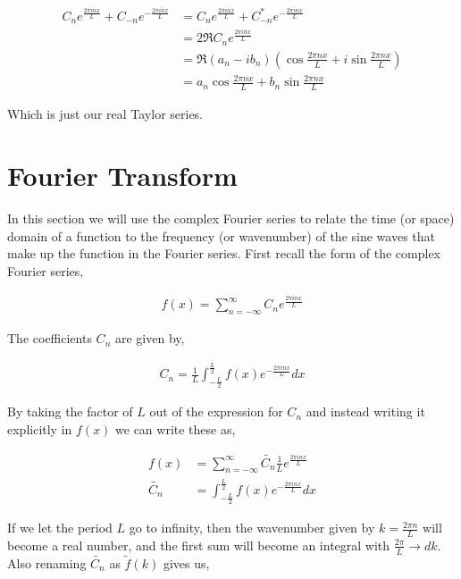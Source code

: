 \documentclass[11pt]{amsart}
\begin{document}
\begin{align*}
  C_n e^{\frac{2\pi inx}{L}} + C_{-n}e^{-\frac{2\pi inx}{L}} &= C_n e^{\frac{2\pi inx}{L}} + C^*_{-n}e^{-\frac{2\pi inx}{L}} \\
                                                             &= 2\Re{C_n e^{\frac{2\pi inx}{L}}} \\
                                                             &= \Re{(a_n - ib_n)\left(\cos{\frac{2\pi nx}{L}} + i\sin{\frac{2\pi nx}{L}}\right)} \\
                                                             &= a_n\cos{\frac{2\pi nx}{L}} + b_n\sin{\frac{2\pi nx}{L}}
\end{align*}

Which is just our real Taylor series.

\section{Fourier Transform}

In this section we will use the complex Fourier series to relate the time (or space) domain of a function to the frequency (or wavenumber) of the sine waves that make up the function in the Fourier series. First recall the form of the complex Fourier series,

\begin{align*}
  f(x) = \sum\limits_{n=-\infty}^{\infty} C_n e^{\frac{2\pi inx}{L}}
\end{align*}

The coefficients $C_n$ are given by,

\begin{align*}
  C_n = \frac{1}{L}\int_{-\frac{L}{2}}^{\frac{L}{2}} f(x) e^{-\frac{2\pi inx}{L}} dx
\end{align*}

By taking the factor of $L$ out of the expression for $C_n$ and instead writing it explicitly in $f(x)$ we can write these as,

\begin{align*}
  f(x) &= \sum\limits_{n=-\infty}^{\infty} \tilde{C_n}\frac{1}{L}e^{\frac{2\pi inx}{L}} \\
  \tilde{C_n} &= \int_{-\frac{L}{2}}^{\frac{L}{2}}f(x)e^{-\frac{2\pi inx}{L}} dx
\end{align*}

If we let the period $L$ go to infinity, then the wavenumber given by $k = \frac{2\pi n}{L}$ will become a real number, and the first sum will become an integral with $\frac{2\pi}{L}\to dk$. Also renaming $\tilde{C_n}$ as $\tilde{f}(k)$ gives us,
\end{document}
